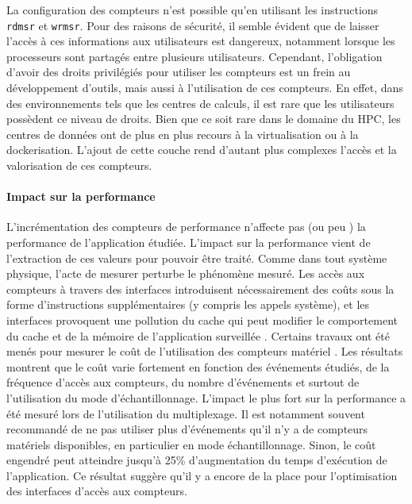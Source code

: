         La configuration des compteurs n'est possible qu'en utilisant les instructions \verb=rdmsr= et \verb=wrmsr=. Pour des raisons de sécurité, il semble évident que de laisser l'accès à ces informations aux utilisateurs est dangereux, notamment lorsque les processeurs sont partagés entre plusieurs utilisateurs. Cependant, l'obligation d'avoir des droits privilégiés pour utiliser les compteurs est un frein au développement d'outils, mais aussi à l'utilisation de ces compteurs. En effet, dans des environnements tels que les centres de calculs, il est rare que les utilisateurs possèdent ce niveau de droits. Bien que ce soit rare dans le domaine du HPC, les centres de données ont de plus en plus recours à la virtualisation ou à la dockerisation. L'ajout de cette couche rend d'autant plus complexes l'accès et la valorisation de ces compteurs. 


    \paragraph{Impact sur la performance}
 
        L'incrémentation des compteurs de performance n'affecte pas (ou peu \cite{Rohl2015}) la performance de l'application étudiée. L'impact sur la performance vient de l'extraction de ces valeurs pour pouvoir être traité. Comme dans tout système physique, l'acte de mesurer perturbe le phénomène mesuré. Les accès aux compteurs à travers des interfaces introduisent nécessairement des coûts sous la forme d'instructions supplémentaires (y compris les appels système), et les interfaces provoquent une pollution du cache qui peut modifier le comportement du cache et de la mémoire de l'application surveillée \cite{Weaver2015}. 
        Certains travaux ont été menés pour mesurer le coût de l'utilisation des compteurs matériel \cite{Bitzes2014}. Les résultats montrent que le coût varie fortement en fonction des événements étudiés, de la fréquence d'accès aux compteurs, du nombre d'événements et surtout de l'utilisation du mode d'échantillonnage. L'impact le plus fort sur la performance a été mesuré lors de l'utilisation du multiplexage. Il est notamment souvent recommandé de ne pas utiliser plus d'événements qu'il n'y a de compteurs matériels disponibles, en particulier en mode échantillonnage. Sinon, le coût engendré peut atteindre jusqu'à 25\% d'augmentation du temps d'exécution de l'application. Ce résultat suggère qu'il y a encore de la place pour l'optimisation des interfaces d'accès aux compteurs. 


